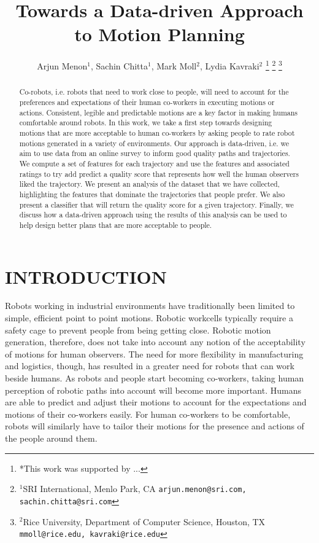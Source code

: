 \documentclass[letterpaper, 10 pt, conference]{ieeeconf}  %
\title{\LARGE \bf
Towards a Data-driven Approach to Motion Planning
}
\author{Arjun Menon$^{1}$, Sachin Chitta$^{1}$, Mark Moll$^{2}$, Lydia Kavraki$^{2}$%
\thanks{*This work was supported by ...}%
\thanks{$^{1}$SRI International, Menlo Park, CA
        {\tt\small arjun.menon@sri.com, sachin.chitta@sri.com}}%
\thanks{$^{2}$Rice University, Department of Computer Science, Houston, TX
        {\tt\small mmoll@rice.edu, kavraki@rice.edu}}%
}
\begin{document}
\maketitle
\thispagestyle{empty}
\pagestyle{empty}


\begin{abstract}

Co-robots, i.e. robots that need to work close to people, will need to account for the preferences and expectations of their human 
co-workers in executing motions or actions. Consistent, legible and predictable motions are a key factor in making humans comfortable 
around robots. In this work, we take a first step towards designing motions that are more acceptable to human co-workers by asking 
people to rate robot motions generated in a variety of environments. Our approach is data-driven, i.e. we aim to use data from an online 
survey to inform good quality paths and trajectories. We compute a set of features for each trajectory and use the features 
and associated ratings to try add predict a quality score that represents how well the human observers liked the trajectory. We present an 
analysis of the dataset that we have collected, highlighting the features that dominate the trajectories that people prefer. We also 
present a classifier that will return the quality score for a given trajectory. Finally, we discuss how a data-driven approach using the 
results of this analysis can be used to help design better plans that are more acceptable to people. 
\end{abstract}


\section{INTRODUCTION}

Robots working in industrial environments have traditionally been limited to simple, efficient point to point motions. Robotic workcells 
typically require a safety cage to prevent people from being getting close. Robotic motion generation, therefore, does not take 
into account any notion of the acceptability of motions for human observers. The need for more flexibility in manufacturing and logistics, 
though, has resulted in a greater need for robots that can work beside humans. As robots and people start becoming co-workers, taking 
human perception of robotic paths into account will become more important. Humans are able to predict and adjust their motions to 
account for the expectations and motions of their co-workers easily. For human co-workers to be comfortable, robots will similarly 
have to tailor their motions for the presence and actions of the people around them. 
\end{document}

